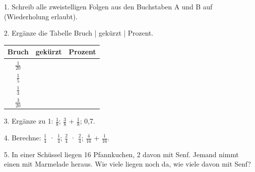 \documentclass[11pt]{article}
\begin{document}
\pfheftstil
{}
\pfrueckblick
\begin{pfaufg}{}{1.}{}
Schreib alle zweistelligen Folgen aus den Buchstaben A und B auf (Wiederholung erlaubt).
\end{pfaufg}
\begin{pfaufg}{}{2.}{}
Ergänze die Tabelle Bruch | gekürzt | Prozent.
\par\smallskip\noindent \begingroup\renewcommand{\arraystretch}{1.3}\begin{tabular}{|c|c|c|}\hline \textbf{Bruch} & \textbf{gekürzt} & \textbf{Prozent} \\ \hline $\tfrac{1}{20}$ & \rule{0pt}{3ex}\hspace{1.6cm} & \rule{0pt}{3ex}\hspace{1.6cm} \\ \hline $\tfrac{1}{5}$ & \rule{0pt}{3ex}\hspace{1.6cm} & \rule{0pt}{3ex}\hspace{1.6cm} \\ \hline $\tfrac{1}{3}$ & \rule{0pt}{3ex}\hspace{1.6cm} & \rule{0pt}{3ex}\hspace{1.6cm} \\ \hline $\tfrac{3}{20}$ & \rule{0pt}{3ex}\hspace{1.6cm} & \rule{0pt}{3ex}\hspace{1.6cm} \\ \hline\end{tabular}\endgroup\par
{}
\end{pfaufg}
\begin{pfaufg}{}{3.}{}
Ergänze zu 1: $\tfrac{1}{8}$; $\tfrac{3}{8}$ + $\tfrac{1}{8}$; 0,7.
\end{pfaufg}
\begin{pfaufg}{}{4.}{}
Berechne: $\tfrac{1}{4}$ · $\tfrac{1}{4}$; $\tfrac{2}{4}$ · $\tfrac{2}{4}$; $\tfrac{4}{16}$ + $\tfrac{1}{16}$.
\end{pfaufg}
\begin{pfaufg}{}{5.}{}
In einer Schüssel liegen 16 Pfannkuchen, 2 davon mit Senf. Jemand nimmt einen mit Marmelade heraus. Wie viele liegen noch da, wie viele davon mit Senf?
\end{pfaufg}
\end{document}

